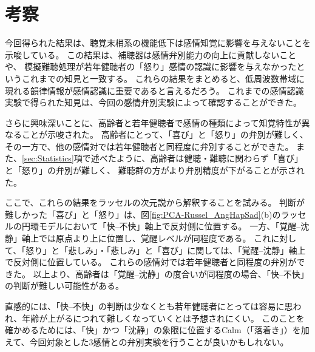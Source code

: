 

\section{考察}
今回得られた結果は、聴覚末梢系の機能低下は感情知覚に影響を与えないことを示唆している。
この結果は、補聴器は感情弁別能力の向上に貢献しないこと\cite{goy2018hearing} や、
模擬難聴処理が若年健聴者の「怒り」感情の認識に影響を与えなかった\cite{morgan2022perceived}というこれまでの知見と一致する。
これらの結果をまとめると、低周波数帯域に現れる韻律情報が感情認識に重要であると言えるだろう\cite{orbelo2005impaired,ben2019age}。
これまでの感情認識実験で得られた知見は、今回の感情弁別実験によって確認することができた。

さらに興味深いことに、高齢者と若年健聴者で感情の種類によって知覚特性が異なることが示唆された。
高齢者にとって、「喜び」と「怒り」の弁別が難しく、その一方で、他の感情対では若年健聴者と同程度に弁別することができた。
また、\ref{sec:Statistics}項で述べたように、高齢者は健聴・難聴に関わらず「喜び」と「怒り」の弁別が難しく、
難聴群の方がより弁別精度が下がることが示された。

ここで、これらの結果をラッセルの次元説\cite{russell1980circumplex}から解釈することを試みる。
判断が難しかった「喜び」と「怒り」は、図\ref{fig:PCA-Russel_AngHapSad}(b)のラッセルの円環モデルにおいて「快--不快」軸上で反対側に位置する。
一方、「覚醒--沈静」軸上では原点より上に位置し、覚醒レベルが同程度である。
これに対して、「怒り」と「悲しみ」・「悲しみ」と「喜び」に関しては、「覚醒--沈静」軸上で反対側に位置している。
これらの感情対では若年健聴者と同程度の弁別ができた。
以上より、高齢者は「覚醒--沈静」の度合いが同程度の場合、「快--不快」の判断が難しい可能性がある。

直感的には、「快--不快」の判断は少なくとも若年健聴者にとっては容易に思われ、年齢が上がるにつれて難しくなっていくとは予想されにくい。
このことを確かめるためには、「快」かつ「沈静」の象限に位置するCalm（「落着き」）を加えて、今回対象とした3感情との弁別実験を行うことが良いかもしれない。




